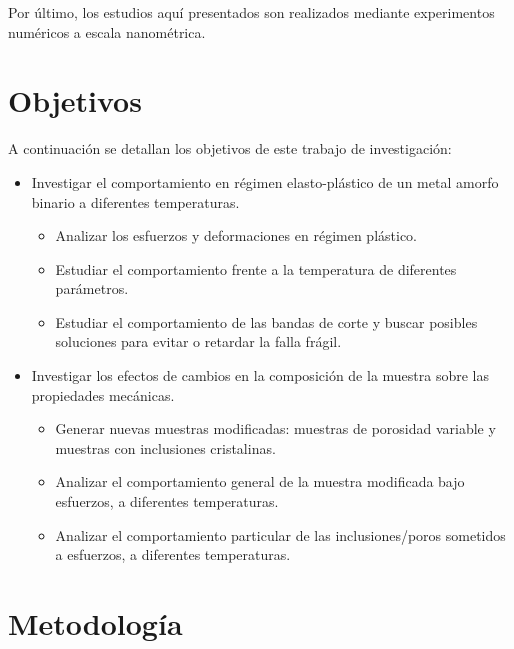 Por último, los estudios aquí presentados son realizados mediante experimentos numéricos a escala nanométrica.



\section{Objetivos}
\label{S1_4}

A continuación se detallan los objetivos de este trabajo de investigación:

\begin{itemize}
 \item Investigar el comportamiento en régimen elasto-plástico de un metal amorfo binario a diferentes temperaturas.
 \begin{itemize}
  \item Analizar los esfuerzos y deformaciones en régimen plástico.
  \item Estudiar el comportamiento frente a la temperatura de diferentes parámetros.
  \item Estudiar el comportamiento de las bandas de corte y buscar posibles soluciones para evitar o retardar la falla frágil.
 \end{itemize}
 \item Investigar los efectos de cambios en la composición de la muestra sobre las propiedades mecánicas.
 \begin{itemize}
  \item Generar nuevas muestras modificadas: muestras de porosidad variable y muestras con inclusiones cristalinas.
  \item Analizar el comportamiento general de la muestra modificada bajo esfuerzos, a diferentes temperaturas.
  \item Analizar el comportamiento particular de las inclusiones/poros sometidos a esfuerzos, a diferentes temperaturas.
 \end{itemize}
\end{itemize}


\section{Metodología}
\label{S1_5}

